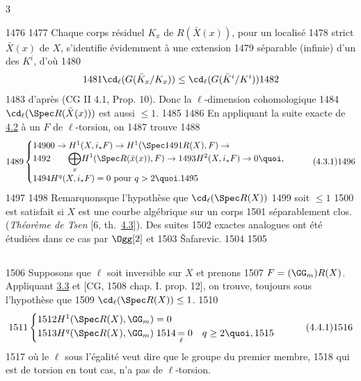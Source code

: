 3	\documentclass[10pt]{../fichiers-configuration-latex/smfart}
\begin{document}
  1476	
  1477	Chaque corps résiduel $K_x$ de $R(\bar{X}(x))$, pour un localisé
  1478	strict $\bar{X}(x)$ de $X$, s'identifie évidemment à une extension
  1479	séparable (infinie) d'un des $K^i$, d'où
  1480	$$
  1481	\cd_{\ell}(G(\bar{K}_x/K_x))\leq \cd_{\ell} (G(\bar{K}^i/K^i))
  1482	$$
  1483	d'après (CG II 4.1, Prop. 10). Donc la $\ell$-dimension cohomologique
  1484	$\cd_{\ell}(\Spec R(\bar{X}(x)))$ est aussi $\leq 1$.
  1485	
  1486	En appliquant la suite exacte de \hyperref[IX.cor4.2]{4.2} à un $F$ de $\ell$-torsion, on
  1487	trouve
  1488	\begin{equation*}
  1489	\begin{cases}
  1490	 0\rightarrow H^1(X,i_{\ast}F)\rightarrow H^1(\Spec
  1491	R(X), F)\rightarrow\\
  1492	\qquad \displaystyle{\bigoplus_x} H^1(\Spec R(\bar{x}(x)),F)\rightarrow
  1493	H^2(X,i_{\ast}F)\rightarrow 0{\quoi},\\
  1494	 H^q(X,i_{\ast}F)=0\mbox{ pour } q> 2{\quoi}.
  1495	\end{cases}\tag{4.3.1}
  1496	\end{equation*}
  1497	
  1498	Remarquons\pageoriginale que l'hypothèse que $\cd_{\ell}(\Spec R(X))$
  1499	soit $\leq 1$
  1500	est satisfait si $X$ est une courbe algébrique sur un corps
  1501	séparablement clos. (\emph{Théorème de Tsen} [6, th.~\hyperref[IX.subsec4.3]{4.3}]). Des suites
  1502	exactes analogues ont été étudiées dans ce cas par $\Ogg[2]$ et
  1503	\v{S}afarevic.
  1504	
  1505	\subsection{}
  1506	Supposons que $\ell$ soit inversible sur $X$ et prenons
  1507	$F=(\GG_m) R(X)$. Appliquant \hyperref[IX.thm3.3]{3.3} et [CG,
  1508	chap. I. prop. 12], on trouve, toujours sous l'hypothèse que
  1509	$\cd_{\ell}(\Spec R(X))\leq 1$.
  1510	\begin{equation*}
  1511	\begin{cases}
  1512	H^1(\Spec R(X), \GG_{m})=0\\
  1513	H^q (\Spec R(X), \GG_{m})\; \displaystyle{
  1514	\mathop{=}_{\ell} }\; 0\quad q\geq 2{\quoi},
  1515	\end{cases}\tag{4.4.1}
  1516	\end{equation*}
  1517	où le $\ell$ sous l'égalité veut dire que le groupe du premier membre,
  1518	qui est de torsion en tout cas, n'a pas de $\ell$-torsion.
\end{document}
